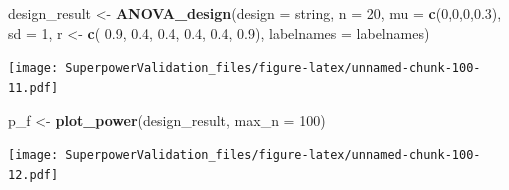 \documentclass[]{book}
\newenvironment{Shaded}{\begin{snugshade}}{\end{snugshade}}
\newcommand{\DataTypeTok}[1]{\textcolor[rgb]{0.13,0.29,0.53}{#1}}
\newcommand{\DecValTok}[1]{\textcolor[rgb]{0.00,0.00,0.81}{#1}}
\newcommand{\FloatTok}[1]{\textcolor[rgb]{0.00,0.00,0.81}{#1}}
\newcommand{\KeywordTok}[1]{\textcolor[rgb]{0.13,0.29,0.53}{\textbf{#1}}}
\newcommand{\NormalTok}[1]{#1}
\newcommand{\StringTok}[1]{\textcolor[rgb]{0.31,0.60,0.02}{#1}}
\begin{document}
\begin{Shaded}
\begin{Highlighting}[]
\NormalTok{design_result <-}\StringTok{ }\KeywordTok{ANOVA_design}\NormalTok{(}\DataTypeTok{design =}\NormalTok{ string,}
                              \DataTypeTok{n =} \DecValTok{20}\NormalTok{, }
                              \DataTypeTok{mu =} \KeywordTok{c}\NormalTok{(}\DecValTok{0}\NormalTok{,}\DecValTok{0}\NormalTok{,}\DecValTok{0}\NormalTok{,}\FloatTok{0.3}\NormalTok{), }
                              \DataTypeTok{sd =} \DecValTok{1}\NormalTok{, }
\NormalTok{                              r <-}\StringTok{ }\KeywordTok{c}\NormalTok{(}
                                \FloatTok{0.9}\NormalTok{, }\FloatTok{0.4}\NormalTok{, }\FloatTok{0.4}\NormalTok{,}
                                \FloatTok{0.4}\NormalTok{, }\FloatTok{0.4}\NormalTok{,}
                                \FloatTok{0.9}\NormalTok{), }
                              \DataTypeTok{labelnames =}\NormalTok{ labelnames)}
\end{Highlighting}
\end{Shaded}

\texttt{[image: SuperpowerValidation\_files/figure-latex/unnamed-chunk-100-11.pdf]}

\begin{Shaded}
\begin{Highlighting}[]
\NormalTok{p_f <-}\StringTok{ }\KeywordTok{plot_power}\NormalTok{(design_result,}
                      \DataTypeTok{max_n =} \DecValTok{100}\NormalTok{)}
\end{Highlighting}
\end{Shaded}

\texttt{[image: SuperpowerValidation\_files/figure-latex/unnamed-chunk-100-12.pdf]}


\end{document}
